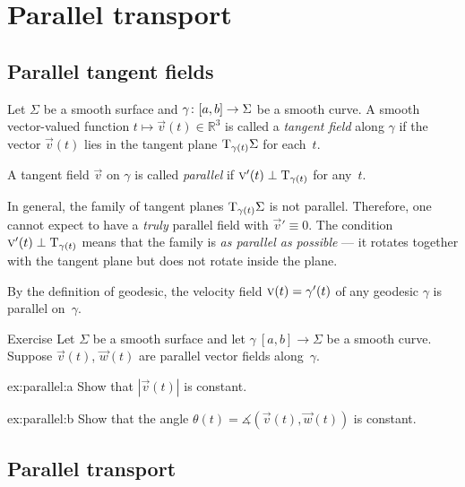 \chapter{Parallel transport}
\label{chap:parallel-transport}

\section{Parallel tangent fields}

Let $\Sigma$ be a smooth surface and $\gamma\:[a,b]\z\to \Sigma$ be a smooth curve.
A smooth vector-valued function $t\mapsto {\vec v}(t) \in \mathbb{R}^3$ is called a \emph{tangent field} along $\gamma$ if
the vector ${\vec v}(t)$ lies in the tangent plane $\mathrm{T}_{\gamma(t)}\Sigma$ for each~$t$.

A tangent field $\vec v$ on $\gamma$ is called \emph{parallel} if ${\text{\sc{v}}}'(t)\perp\mathrm{T}_{\gamma(t)}$ for any~$t$.

In general, the family of tangent planes $\mathrm{T}_{\gamma(t)}\Sigma$ is not parallel.
Therefore, one cannot expect to have a \textit{truly} parallel field with ${\vec v}'\equiv 0$.
The condition ${\text{\sc{v}}}'(t)\perp\mathrm{T}_{\gamma(t)}$ means that the family is \textit{as parallel as possible} --- it rotates together with the tangent plane but does not rotate inside the plane.

By the definition of geodesic, the velocity field ${\vec v}(t)\z=\gamma'(t)$ of any geodesic $\gamma$ is parallel on~$\gamma$.

\begin{thm}{Exercise}\label{ex:parallel}
Let $\Sigma$ be a smooth surface and let 
$\gamma\:[a,b]\to \Sigma$ be a smooth curve.
Suppose ${\vec v}(t)$, $\vec w(t)$ are parallel vector fields along~$\gamma$.

\begin{subthm}{ex:parallel:a} Show that $|{\vec v}(t)|$ is constant.
\end{subthm}

\begin{subthm}{ex:parallel:b} Show that the angle $\theta(t)=\measuredangle({\vec v}(t),\vec w(t))$ is constant.
\end{subthm}

\end{thm}

\section{Parallel transport}

